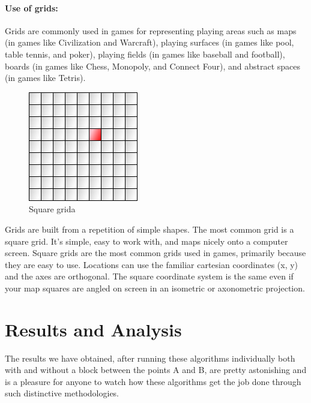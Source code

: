 \documentclass[a4paper]{article}
\begin{document}
\paragraph{Use of grids:} Grids are commonly used in games for representing playing areas such as maps (in games like Civilization and Warcraft), playing surfaces (in games like pool, table tennis, and poker), playing fields (in games like baseball and football), boards (in games like Chess, Monopoly, and Connect Four), and abstract spaces (in games like Tetris). \\

\begin{figure}[h!]
  \centering
    \includegraphics[scale=.6]{images/square-grid.png}
  \caption{Square grida}
\end{figure}

\noindent Grids are built from a repetition of simple shapes. The most common grid is a square grid. It’s simple, easy to work with, and maps nicely onto a computer screen. Square grids are the most common grids used in games, primarily because they are easy to use. Locations can use the familiar cartesian coordinates (x, y) and the axes are orthogonal. The square coordinate system is the same even if your map squares are angled on screen in an isometric or axonometric projection.


\section{Results and Analysis}

The results we have obtained, after running these algorithms individually both with and without a block between the points A and B, are pretty astonishing and is a pleasure for anyone to watch how these algorithms get the job done through such distinctive methodologies.\\
\end{document}
